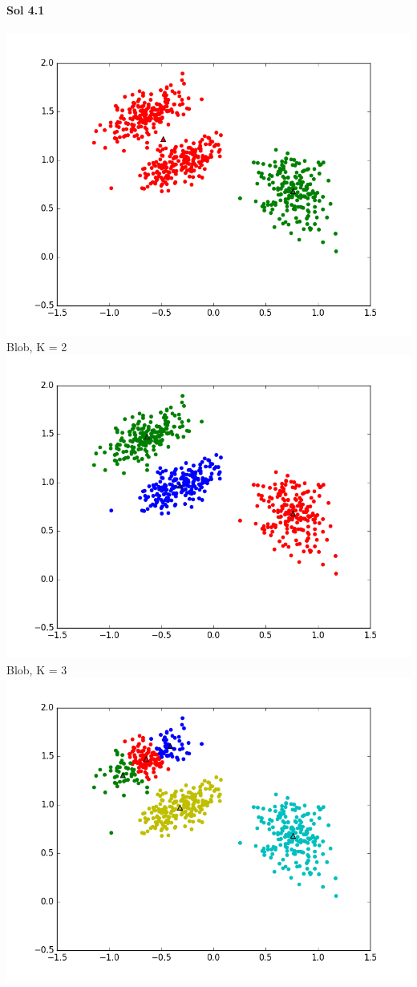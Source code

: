 \documentclass[]{report}
\begin{document}
\paragraph{Sol 4.1}
	\begin{center}
		\includegraphics[width=\textwidth]{blob-2}
		Blob, K = 2
		\includegraphics[width=\textwidth]{blob-3}
		Blob, K = 3
		\includegraphics[width=\textwidth]{blob-5}

\end{center}
\end{document}
